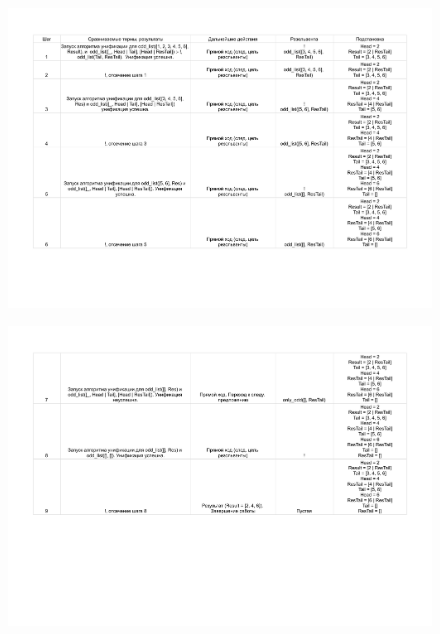 \documentclass[12pt]{report}
\begin{document}
\begin{figure}[H]
	\begin{center}
		\includegraphics[scale=0.7]{imgs/table_18-1.pdf}
	\end{center}
\end{figure}
\vspace{-1.65cm}
\begin{figure}[H]
	\begin{center}
		\includegraphics[scale=0.7]{imgs/table_18-2.pdf}
	\end{center}
\end{figure}
\end{document}
